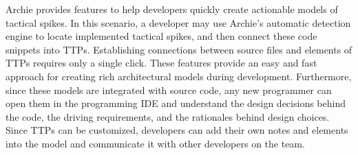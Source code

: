 Archie provides features to help developers quickly create actionable models of tactical spikes. In this scenario, a developer may use Archie's automatic detection engine to locate implemented tactical spikes, and then connect these code snippets into TTPs. Establishing connections between source files and elements of TTPs requires only a single click. These features provide an easy and fast approach for creating rich architectural models during development. Furthermore, since these models are integrated with source code, any new programmer can open them in the programming IDE and understand the design decisions behind the code, the driving requirements, and the rationales behind design choices. Since TTPs can be customized, developers can add their own notes and elements into the model and communicate it with other developers on the team.